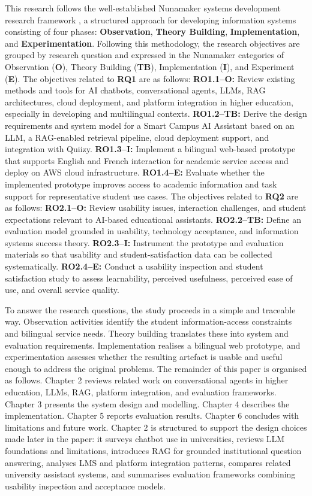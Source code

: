 \documentclass[a4paper,9pt,twocolumn]{extarticle}
\begin{document}
This research follows the well-established Nunamaker systems development
research framework \cite{nunamaker1991}, a structured approach for
developing information systems consisting of four phases:
\textbf{Observation}, \textbf{Theory Building}, \textbf{Implementation}, and
\textbf{Experimentation}. Following this methodology, the research
objectives are grouped by research question and expressed in the
Nunamaker categories of Observation (\textbf{O}), Theory Building
(\textbf{TB}), Implementation (\textbf{I}), and Experiment
(\textbf{E}). The objectives related to \textbf{RQ1} are as follows:
\textbf{RO1.1--O:} Review existing methods and tools for AI chatbots,
conversational agents, LLMs, RAG architectures, cloud deployment, and
platform integration in higher education, especially in developing and
multilingual contexts. \textbf{RO1.2--TB:} Derive the design requirements
and system model for a Smart Campus AI Assistant based on an LLM, a
RAG-enabled retrieval pipeline, cloud deployment support, and
integration with Quiizy. \textbf{RO1.3--I:} Implement a bilingual
web-based prototype that supports English and French interaction for
academic service access and deploy on AWS cloud infrastructure. \textbf{RO1.4--E:} Evaluate whether the
implemented prototype improves access to academic information and task
support for representative student use cases. The objectives related to
\textbf{RQ2} are as follows: \textbf{RO2.1--O:} Review usability issues,
interaction challenges, and student expectations relevant to AI-based
educational assistants. \textbf{RO2.2--TB:} Define an evaluation model
grounded in usability, technology acceptance, and information systems
success theory. \textbf{RO2.3--I:} Instrument the prototype and
evaluation materials so that usability and student-satisfaction data can
be collected systematically. \textbf{RO2.4--E:} Conduct a usability
inspection and student satisfaction study to assess learnability,
perceived usefulness, perceived ease of use, and overall service
quality.

To answer the research questions, the study proceeds in a simple and
traceable way. Observation activities identify the student
information-access constraints and bilingual service needs. Theory
building translates these into system and evaluation requirements.
Implementation realises a bilingual web prototype, and experimentation
assesses whether the resulting artefact is usable and useful enough to
address the original problems. The remainder of this paper is organised
as follows. Chapter 2 reviews related work on conversational agents in
higher education, LLMs, RAG, platform integration, and evaluation
frameworks. Chapter 3 presents the system design and modelling. Chapter
4 describes the implementation. Chapter 5 reports evaluation results.
Chapter 6 concludes with limitations and future work. Chapter 2 is
structured to support the design choices made later in the paper: it
surveys chatbot use in universities, reviews LLM foundations and
limitations, introduces RAG for grounded institutional question
answering, analyses LMS and platform integration patterns, compares
related university assistant systems, and summarises evaluation
frameworks combining usability inspection and acceptance models.
\end{document}
